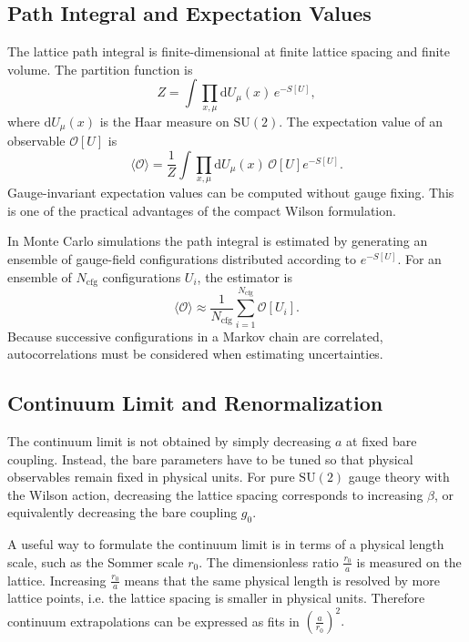 \documentclass[12pt,a4paper,oneside,numbers=noenddot]{scrreprt}
\newcommand{\SU}{\mathrm{SU}}
\newcommand{\dd}{\mathrm{d}}
\newcommand{\latspacing}{a}
\newcommand{\rzero}{r_0}
\begin{document}
\subsection{Path Integral and Expectation Values}
\label{subsec:lattice-path-integral}

The lattice path integral is finite-dimensional at finite lattice spacing and
finite volume. The partition function is
\begin{equation}
  Z
  =
  \int
  \prod_{x,\mu}
  \dd U_\mu(x)
  \,
  e^{-S[U]},
  \label{eq:lattice-partition-function}
\end{equation}
where $\dd U_\mu(x)$ is the Haar measure on $\SU(2)$. The expectation value of
an observable $\mathcal{O}[U]$ is
\begin{equation}
  \langle \mathcal{O} \rangle
  =
  \frac{1}{Z}
  \int
  \prod_{x,\mu}
  \dd U_\mu(x)
  \,
  \mathcal{O}[U]
  e^{-S[U]}.
  \label{eq:lattice-expectation-value}
\end{equation}
Gauge-invariant expectation values can be computed without gauge fixing. This
is one of the practical advantages of the compact Wilson formulation.

In Monte Carlo simulations the path integral is estimated by generating an
ensemble of gauge-field configurations distributed according to $e^{-S[U]}$.
For an ensemble of $N_{\mathrm{cfg}}$ configurations $U_i$, the estimator is
\begin{equation}
  \langle \mathcal{O} \rangle
  \approx
  \frac{1}{N_{\mathrm{cfg}}}
  \sum_{i=1}^{N_{\mathrm{cfg}}}
  \mathcal{O}[U_i].
\end{equation}
Because successive configurations in a Markov chain are correlated,
autocorrelations must be considered when estimating uncertainties.

\subsection{Continuum Limit and Renormalization}
\label{subsec:continuum-limit-renormalization}

The continuum limit is not obtained by simply decreasing $\latspacing$ at fixed
bare coupling. Instead, the bare parameters have to be tuned so that physical
observables remain fixed in physical units. For pure $\SU(2)$ gauge theory with
the Wilson action, decreasing the lattice spacing corresponds to increasing
$\beta$, or equivalently decreasing the bare coupling $g_0$.

A useful way to formulate the continuum limit is in terms of a physical length
scale, such as the Sommer scale $\rzero$. The dimensionless ratio \(\frac{\rzero}{\latspacing}\)
is measured on the lattice. Increasing \(\frac{\rzero}{\latspacing}\) means that the same
physical length is resolved by more lattice points, i.e. the lattice spacing is
smaller in physical units. Therefore continuum extrapolations can be expressed
as fits in \(\left(\frac{\latspacing}{\rzero}\right)^2.\)
\end{document}

